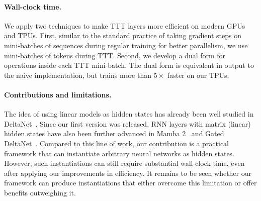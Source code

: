\documentclass{article}
\begin{document}
\paragraph{Wall-clock time.} We apply two techniques to make TTT layers more efficient on modern GPUs and TPUs. First, similar to the standard practice of taking gradient steps on mini-batches of sequences during regular training for better parallelism, we use mini-batches of tokens during TTT.
Second, we develop a dual form for operations inside each TTT mini-batch.
The dual form is equivalent in output to the naive implementation, but trains more than $5\times$ faster on our TPUs.

\paragraph{Contributions and limitations.}
The idea of using linear models as hidden states has already been well studied in DeltaNet~\cite{schlag2021linear, yang2024parallelizing}.
Since our first version was released, RNN layers with matrix (linear) hidden states have also been further advanced in Mamba 2~\cite{dao2024transformers} and Gated DeltaNet~\cite{yang2023gated}.
Compared to this line of work, our contribution is a practical framework that can instantiate arbitrary neural networks as hidden states.
However, such instantiations can still require substantial wall-clock time, even after applying our improvements in efficiency.
It remains to be seen whether our framework can produce instantiations that either overcome this limitation or offer benefits outweighing it.
\end{document}
